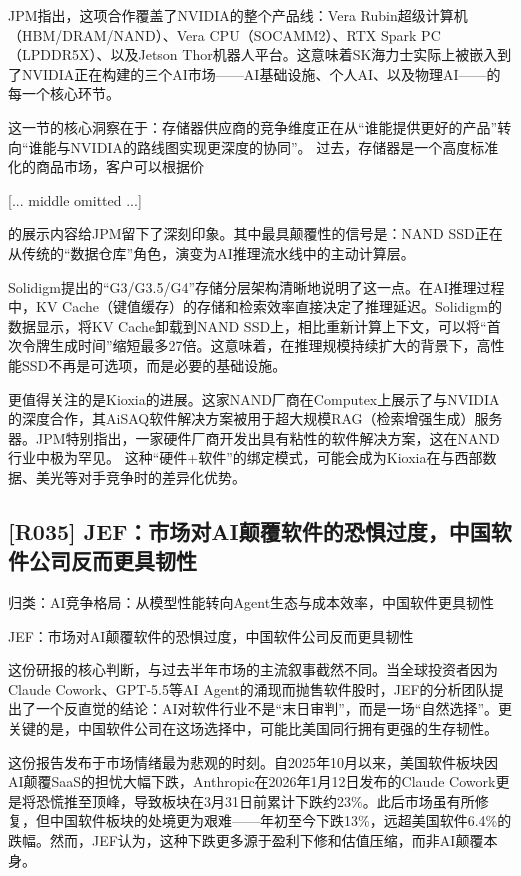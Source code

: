 \documentclass[11pt]{ctexart}
\begin{document}
JPM指出，这项合作覆盖了NVIDIA的整个产品线：Vera Rubin超级计算机（HBM/DRAM/NAND）、Vera CPU（SOCAMM2）、RTX Spark PC（LPDDR5X）、以及Jetson Thor机器人平台。这意味着SK海力士实际上被嵌入到了NVIDIA正在构建的三个AI市场——AI基础设施、个人AI、以及物理AI——的每一个核心环节。

这一节的核心洞察在于：存储器供应商的竞争维度正在从“谁能提供更好的产品”转向“谁能与NVIDIA的路线图实现更深度的协同”。 过去，存储器是一个高度标准化的商品市场，客户可以根据价

[... middle omitted ...]

的展示内容给JPM留下了深刻印象。其中最具颠覆性的信号是：NAND SSD正在从传统的“数据仓库”角色，演变为AI推理流水线中的主动计算层。

Solidigm提出的“G3/G3.5/G4”存储分层架构清晰地说明了这一点。在AI推理过程中，KV Cache（键值缓存）的存储和检索效率直接决定了推理延迟。Solidigm的数据显示，将KV Cache卸载到NAND SSD上，相比重新计算上下文，可以将“首次令牌生成时间”缩短最多27倍。这意味着，在推理规模持续扩大的背景下，高性能SSD不再是可选项，而是必要的基础设施。

更值得关注的是Kioxia的进展。这家NAND厂商在Computex上展示了与NVIDIA的深度合作，其AiSAQ软件解决方案被用于超大规模RAG（检索增强生成）服务器。JPM特别指出，一家硬件厂商开发出具有粘性的软件解决方案，这在NAND行业中极为罕见。 这种“硬件+软件”的绑定模式，可能会成为Kioxia在与西部数据、美光等对手竞争时的差异化优势。

\subsection{[R035] JEF：市场对AI颠覆软件的恐惧过度，中国软件公司反而更具韧性}
{\small\color{refgray}归类：AI竞争格局：从模型性能转向Agent生态与成本效率，中国软件更具韧性}

JEF：市场对AI颠覆软件的恐惧过度，中国软件公司反而更具韧性

这份研报的核心判断，与过去半年市场的主流叙事截然不同。当全球投资者因为Claude Cowork、GPT-5.5等AI Agent的涌现而抛售软件股时，JEF的分析团队提出了一个反直觉的结论：AI对软件行业不是“末日审判”，而是一场“自然选择”。更关键的是，中国软件公司在这场选择中，可能比美国同行拥有更强的生存韧性。

这份报告发布于市场情绪最为悲观的时刻。自2025年10月以来，美国软件板块因AI颠覆SaaS的担忧大幅下跌，Anthropic在2026年1月12日发布的Claude Cowork更是将恐慌推至顶峰，导致板块在3月31日前累计下跌约23\%。此后市场虽有所修复，但中国软件板块的处境更为艰难——年初至今下跌13\%，远超美国软件6.4\%的跌幅。然而，JEF认为，这种下跌更多源于盈利下修和估值压缩，而非AI颠覆本身。
\end{document}
